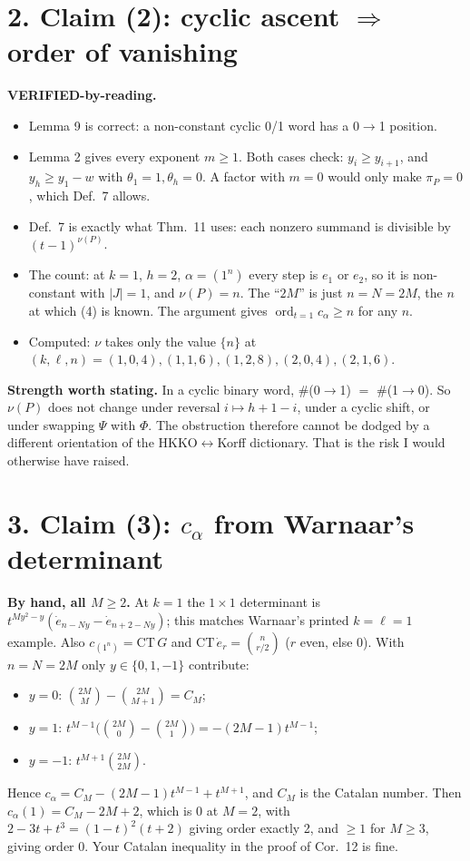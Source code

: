 \documentclass[10pt]{article}
\newcommand{\ord}{\operatorname{ord}_{t=1}}
\begin{document}
\section*{2. Claim (2): cyclic ascent $\Rightarrow$ order of vanishing}
\textbf{VERIFIED-by-reading.}
\begin{itemize}
\item Lemma 9 is correct: a non-constant cyclic 0/1 word has a 0$\to$1 position.
\item Lemma 2 gives every exponent $m\ge1$. Both cases check: $y_i\ge y_{i+1}$, and $y_h\ge y_1-w$ with $\theta_1=1,\theta_h=0$. A factor with $m=0$ would only make $\pi_P=0$, which Def.~7 allows.
\item Def.~7 is exactly what Thm.~11 uses: each nonzero summand is divisible by $(t-1)^{\nu(P)}$.
\item The count: at $k=1$, $h=2$, $\alpha=(1^n)$ every step is $e_1$ or $e_2$, so it is non-constant with $|J|=1$, and $\nu(P)=n$. The ``$2M$'' is just $n=N=2M$, the $n$ at which (4) is known. The argument gives $\ord c_\alpha\ge n$ for any $n$.
\item Computed: $\nu$ takes only the value $\{n\}$ at $(k,\ell,n)=(1,0,4),(1,1,6),(1,2,8),(2,0,4),(2,1,6)$.
\end{itemize}

\textbf{Strength worth stating.} In a cyclic binary word, \#(0$\to$1) $=$ \#(1$\to$0). So $\nu(P)$ does not change
under reversal $i\mapsto h+1-i$, under a cyclic shift, or under swapping $\Psi$ with $\Phi$. The obstruction
therefore cannot be dodged by a different orientation of the HKKO$\leftrightarrow$Korff dictionary. That is the
risk I would otherwise have raised.

\section*{3. Claim (3): $c_\alpha$ from Warnaar's determinant}
\textbf{By hand, all $M\ge2$.} At $k=1$ the $1\times1$ determinant is
$t^{My^2-y}(\dot e_{n-Ny}-\dot e_{n+2-Ny})$; this matches Warnaar's printed $k=\ell=1$ example. Also
$c_{(1^n)}=\mathrm{CT}\,G$ and $\mathrm{CT}\,\dot e_r=\binom{n}{r/2}$ ($r$ even, else $0$). With $n=N=2M$ only
$y\in\{0,1,-1\}$ contribute:
\begin{itemize}
\item $y=0$: $\binom{2M}{M}-\binom{2M}{M+1}=C_M$;
\item $y=1$: $t^{M-1}\bigl(\binom{2M}{0}-\binom{2M}{1}\bigr)=-(2M-1)t^{M-1}$;
\item $y=-1$: $t^{M+1}\binom{2M}{2M}$.
\end{itemize}
Hence $c_\alpha=C_M-(2M-1)t^{M-1}+t^{M+1}$, and $C_M$ is the Catalan number. Then $c_\alpha(1)=C_M-2M+2$, which
is $0$ at $M=2$, with $2-3t+t^3=(1-t)^2(t+2)$ giving order exactly 2, and $\ge1$ for $M\ge3$, giving order 0. Your
Catalan inequality in the proof of Cor.~12 is fine.
\end{document}
